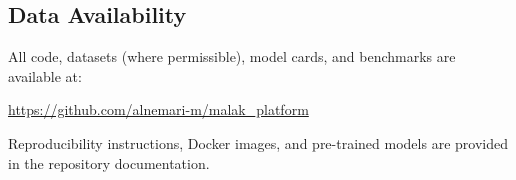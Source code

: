 \subsection*{Data Availability}

All code, datasets (where permissible), model cards, and benchmarks are available at:
\begin{center}
\url{https://github.com/alnemari-m/malak_platform}
\end{center}

Reproducibility instructions, Docker images, and pre-trained models are provided in the repository documentation.
